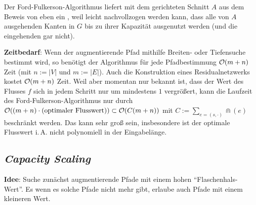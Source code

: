 Der Ford-Fulkerson-Algorithmus liefert mit dem gerichteten Schnitt $A$ aus dem Beweis von eben
ein , weil leicht nachvollzogen werden kann, dass alle von $A$
ausgehenden Kanten in $G$ bis zu ihrer Kapazität ausgenutzt werden
(und die eingehenden gar nicht).

\linie

\textbf{Zeitbedarf}:
Wenn der augmentierende Pfad mithilfe Breiten- oder Tiefensuche bestimmt wird,
so benötigt der Algorithmus für jede Pfadbestimmung $\mathcal{O}(m + n)$ Zeit
(mit $n := |V|$ und $m := |E|$).
Auch die Konstruktion eines Residualnetzwerks kostet $\mathcal{O}(m + n)$ Zeit.
Weil aber momentan nur bekannt ist, dass der Wert des Flusses $f$ sich in jedem Schritt nur um
mindestens $1$ vergrößert, kann die Laufzeit des Ford-Fulkerson-Algorithmus nur durch\\
$\mathcal{O}((m + n) \cdot (\text{optimaler Flusswert})) \subset \mathcal{O}(C(m + n))$
mit $C := \sum_{e = (s, \cdot)} \Cap(e)$ beschränkt werden.
Das kann sehr groß sein, insbesondere ist der optimale Flusswert i.\,A. nicht polynomiell in der
Eingabelänge.

\pagebreak

\subsection{%
    \emph{Capacity Scaling}%
}

\textbf{Idee}:
Suche zunächst augmentierende Pfade mit einem hohen "`Flaschenhals-Wert"'.
Es wenn es solche Pfade nicht mehr gibt, erlaube auch Pfade mit einem kleineren Wert.

